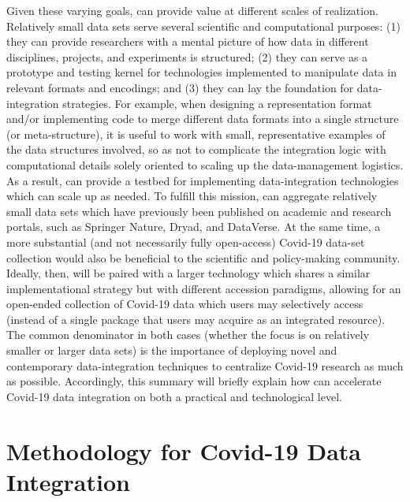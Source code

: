 \documentclass[11pt,letterpaper]{article}
\newcommand{\textscc}[1]{{\color{orr!35!black}{{%
						\fontfamily{Cabin-TLF}\fontseries{b}\selectfont{\textsc{\scriptsize{#1}}}}}}}
\newcommand{\AcronymText}[1]{{\textscc{#1}}}
\newcommand{\CRtwo}{{\resizebox{!}{7pt}{\AcronymText{CR2}}}}
\newcommand{\p}[1]{

\vspace{.6em}#1}
\begin{document}
{\p{Given these varying goals, \CRtwo{} can provide value at different 
scales of realization.  Relatively small data 
sets serve several scientific and computational 
purposes: (1) they can provide researchers 
with a mental picture of how data in different 
disciplines, projects, and experiments is structured; 
(2) they can serve as a prototype and testing 
kernel for technologies implemented to manipulate 
data in relevant formats and encodings; and 
(3) they can lay the foundation for data-integration 
strategies.  For example, when designing a 
representation format and/or implementing code 
to merge different data formats into a single 
structure (or meta-structure), it is useful 
to work with small, representative examples 
of the data structures involved, so as not 
to complicate the integration logic with 
computational details solely oriented to 
scaling up the data-management logistics.  
As a result, \CRtwo{} can provide a 
testbed for implementing data-integration 
technologies which can scale up as needed.  
To fulfill this mission, \CRtwo{} can aggregate 
relatively small data sets which have 
previously been published on academic and research 
portals, such as Springer Nature, Dryad, and DataVerse.  
At the same time, a more substantial 
(and not necessarily fully open-access) Covid-19 
data-set collection would also be beneficial to the 
scientific and policy-making community.  Ideally, then, 
\CRtwo{} will be paired with a larger technology which shares 
a similar implementational strategy but with different 
accession paradigms, allowing for an open-ended 
collection of Covid-19 data which users may 
selectively access (instead of a single package 
that users may acquire as an integrated resource).  
The common denominator in both cases 
(whether the focus is on relatively smaller or 
larger data sets) is the 
importance of deploying novel and contemporary 
data-integration techniques to centralize 
Covid-19 research as much as possible.  
Accordingly, this summary will briefly explain 
how \CRtwo{} can accelerate Covid-19 data integration 
on both a practical and technological level.}
 
\section{Methodology for Covid-19 Data Integration}

}
\end{document}
